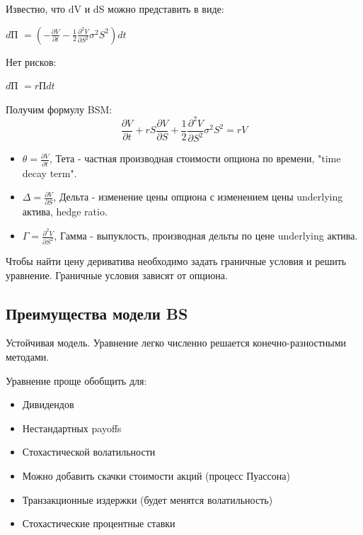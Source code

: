\documentclass{article}
\begin{document}
Известно, что dV и dS можно представить в виде:
\newline

$d$П \( =(-\frac{\partial V}{\partial t} - \frac{1}{2} \frac{\partial^2 V}{\partial S^2}\sigma^2 S^2)dt\)
\newline

Нет рисков:
\newline

$d$П \(= r\)П\(dt\)
\newline

Получим формулу BSM:
\[\frac{\partial V}{\partial t} + r S \frac{\partial V}{\partial S} + \frac{1}{2}\frac{\partial^2 V}{\partial S^2}\sigma^2 S^2 = rV\]
\begin{itemize}

    \item \(\theta = \frac{\partial V}{\partial t}\), Тета - частная производная стоимости опциона по времени, "time decay term". 
    
    \item \(\Delta = \frac{\partial V}{\partial S}\), Дельта - изменение цены опциона с изменением цены underlying актива, hedge ratio. 
    
    \item \(\Gamma = \frac{\partial^2 V}{\partial S^2}\), Гамма - выпуклость, производная дельты по цене underlying актива. 
\end{itemize}
\newline

Чтобы найти цену дериватива необходимо задать граничные условия и решить уравнение. Граничные условия зависят от опциона.
\subsection{Преимущества модели BS}
Устойчивая модель. Уравнение легко численно решается конечно-разностными методами.

Уравнение проще обобщить для:
\begin{itemize}
    \item Дивидендов
    \item Нестандартных payoffs
    \item Стохастической волатильности
    \item Можно добавить скачки стоимости акций (процесс Пуассона)
    \item Транзакционные издержки (будет менятся волатильность)
    \item Стохастические процентные ставки
\end{itemize}
\end{document}
